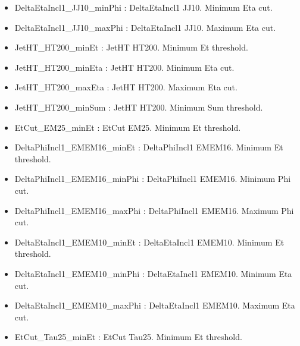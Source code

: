 \begin{itemize}
 \item DeltaEtaIncl1\_JJ10\_minPhi : DeltaEtaIncl1 JJ10. Minimum Eta cut.
 \item DeltaEtaIncl1\_JJ10\_maxPhi : DeltaEtaIncl1 JJ10. Maximum Eta cut.
 \item JetHT\_HT200\_minEt : JetHT HT200. Minimum Et threshold.
 \item JetHT\_HT200\_minEta : JetHT HT200. Minimum Eta cut.
 \item JetHT\_HT200\_maxEta : JetHT HT200. Maximum Eta cut.
 \item JetHT\_HT200\_minSum : JetHT HT200. Minimum Sum threshold.
 \item EtCut\_EM25\_minEt : EtCut EM25. Minimum Et threshold.
 \item DeltaPhiIncl1\_EMEM16\_minEt : DeltaPhiIncl1 EMEM16. Minimum Et threshold.
 \item DeltaPhiIncl1\_EMEM16\_minPhi : DeltaPhiIncl1 EMEM16. Minimum Phi cut.
 \item DeltaPhiIncl1\_EMEM16\_maxPhi : DeltaPhiIncl1 EMEM16. Maximum Phi cut.
 \item DeltaEtaIncl1\_EMEM10\_minEt : DeltaEtaIncl1 EMEM10. Minimum Et threshold.
 \item DeltaEtaIncl1\_EMEM10\_minPhi : DeltaEtaIncl1 EMEM10. Minimum Eta cut.
 \item DeltaEtaIncl1\_EMEM10\_maxPhi : DeltaEtaIncl1 EMEM10. Maximum Eta cut.
 \item EtCut\_Tau25\_minEt : EtCut Tau25. Minimum Et threshold.
\end{itemize}



%


